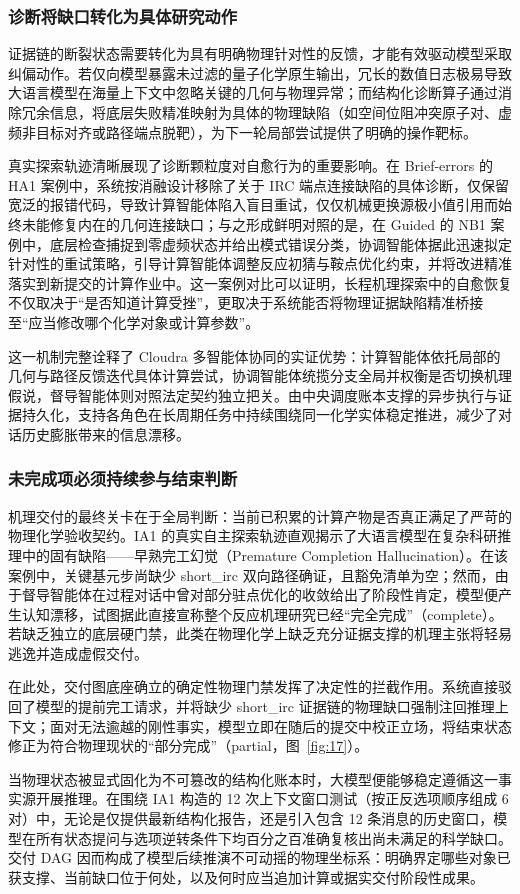 \subsubsection{诊断将缺口转化为具体研究动作}

证据链的断裂状态需要转化为具有明确物理针对性的反馈，才能有效驱动模型采取纠偏动作。若仅向模型暴露未过滤的量子化学原生输出，冗长的数值日志极易导致大语言模型在海量上下文中忽略关键的几何与物理异常；而结构化诊断算子通过消除冗余信息，将底层失败精准映射为具体的物理缺陷（如空间位阻冲突原子对、虚频非目标对齐或路径端点脱靶），为下一轮局部尝试提供了明确的操作靶标。

真实探索轨迹清晰展现了诊断颗粒度对自愈行为的重要影响。在 Brief-errors 的 HA1 案例中，系统按消融设计移除了关于 IRC 端点连接缺陷的具体诊断，仅保留宽泛的报错代码，导致计算智能体陷入盲目重试，仅仅机械更换源极小值引用而始终未能修复内在的几何连接缺口；与之形成鲜明对照的是，在 Guided 的 NB1 案例中，底层检查捕捉到零虚频状态并给出模式错误分类，协调智能体据此迅速拟定针对性的重试策略，引导计算智能体调整反应初猜与鞍点优化约束，并将改进精准落实到新提交的计算作业中。这一案例对比可以证明，长程机理探索中的自愈恢复不仅取决于“是否知道计算受挫”，更取决于系统能否将物理证据缺陷精准桥接至“应当修改哪个化学对象或计算参数”。\citep{ref18}

这一机制完整诠释了 Cloudra 多智能体协同的实证优势：计算智能体依托局部的几何与路径反馈迭代具体计算尝试，协调智能体统揽分支全局并权衡是否切换机理假说，督导智能体则对照法定契约独立把关。由中央调度账本支撑的异步执行与证据持久化，支持各角色在长周期任务中持续围绕同一化学实体稳定推进，减少了对话历史膨胀带来的信息漂移。

\subsubsection{未完成项必须持续参与结束判断}

机理交付的最终关卡在于全局判断：当前已积累的计算产物是否真正满足了严苛的物理化学验收契约。IA1 的真实自主探索轨迹直观揭示了大语言模型在复杂科研推理中的固有缺陷——早熟完工幻觉（Premature Completion Hallucination）。在该案例中，关键基元步尚缺少 short\_irc 双向路径确证，且豁免清单为空；然而，由于督导智能体在过程对话中曾对部分驻点优化的收敛给出了阶段性肯定，模型便产生认知漂移，试图据此直接宣称整个反应机理研究已经“完全完成”（complete）。若缺乏独立的底层硬门禁，此类在物理化学上缺乏充分证据支撑的机理主张将轻易逃逸并造成虚假交付。

在此处，交付图底座确立的确定性物理门禁发挥了决定性的拦截作用。系统直接驳回了模型的提前完工请求，并将缺少 short\_irc 证据链的物理缺口强制注回推理上下文；面对无法逾越的刚性事实，模型立即在随后的提交中校正立场，将结束状态修正为符合物理现状的“部分完成”（partial，图~\ref{fig:17}）。

当物理状态被显式固化为不可篡改的结构化账本时，大模型便能够稳定遵循这一事实源开展推理。在围绕 IA1 构造的 12 次上下文窗口测试（按正反选项顺序组成 6 对）中，无论是仅提供最新结构化报告，还是引入包含 12 条消息的历史窗口，模型在所有状态提问与选项逆转条件下均百分之百准确复核出尚未满足的科学缺口。交付 DAG 因而构成了模型后续推演不可动摇的物理坐标系：明确界定哪些对象已获支撑、当前缺口位于何处，以及何时应当追加计算或据实交付阶段性成果。



